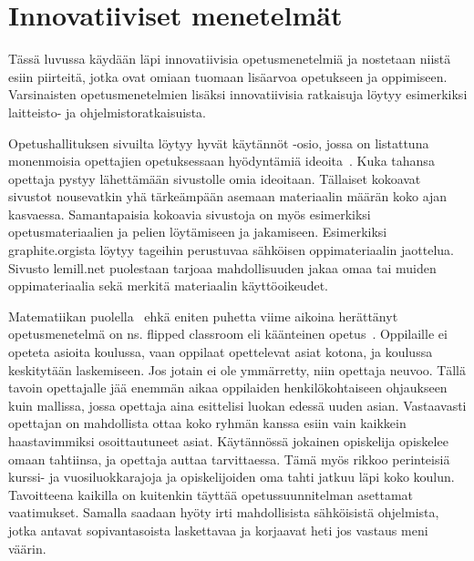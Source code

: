 \documentclass[utf8,bachelor]{gradu3}
\begin{document}
\chapter{Innovatiiviset menetelmät}
Tässä luvussa käydään läpi innovatiivisia opetusmenetelmiä ja nostetaan niistä esiin piirteitä, jotka ovat omiaan tuomaan lisäarvoa opetukseen ja oppimiseen. Varsinaisten opetusmenetelmien lisäksi innovatiivisia ratkaisuja löytyy esimerkiksi laitteisto- ja ohjelmistoratkaisuista.

Opetushallituksen sivuilta löytyy hyvät käytännöt -osio, jossa on listattuna monenmoisia opettajien opetuksessaan hyödyntämiä ideoita~\parencite[][]{hyvatkaytannot}. Kuka tahansa opettaja pystyy lähettämään sivustolle omia ideoitaan. Tällaiset kokoavat sivustot nousevatkin yhä tärkeämpään asemaan materiaalin määrän koko ajan kasvaessa. Samantapaisia kokoavia sivustoja on myös esimerkiksi opetusmateriaalien ja pelien löytämiseen ja jakamiseen. Esimerkiksi graphite.orgista löytyy tageihin perustuvaa sähköisen oppimateriaalin jaottelua. Sivusto lemill.net puolestaan tarjoaa mahdollisuuden jakaa omaa tai muiden oppimateriaalia sekä merkitä materiaalin käyttöoikeudet.

Matematiikan puolella~\parencite[][]{maot} ehkä eniten puhetta viime aikoina herättänyt opetusmenetelmä on ns. flipped classroom eli käänteinen opetus~\parencite[][]{flipped}. Oppilaille ei opeteta asioita koulussa, vaan oppilaat opettelevat asiat kotona, ja koulussa keskitytään laskemiseen. Jos jotain ei ole ymmärretty, niin opettaja neuvoo. Tällä tavoin opettajalle jää enemmän aikaa oppilaiden henkilökohtaiseen ohjaukseen kuin mallissa, jossa opettaja aina esittelisi luokan edessä uuden asian. Vastaavasti opettajan on mahdollista ottaa koko ryhmän kanssa esiin vain kaikkein haastavimmiksi osoittautuneet asiat. Käytännössä jokainen opiskelija opiskelee omaan tahtiinsa, ja opettaja auttaa tarvittaessa. Tämä myös rikkoo perinteisiä kurssi- ja vuosiluokkarajoja ja opiskelijoiden oma tahti jatkuu läpi koko koulun. Tavoitteena kaikilla on kuitenkin täyttää opetussuunnitelman asettamat vaatimukset. Samalla saadaan hyöty irti mahdollisista sähköisistä ohjelmista, jotka antavat sopivantasoista laskettavaa ja korjaavat heti jos vastaus meni väärin.
\end{document}
